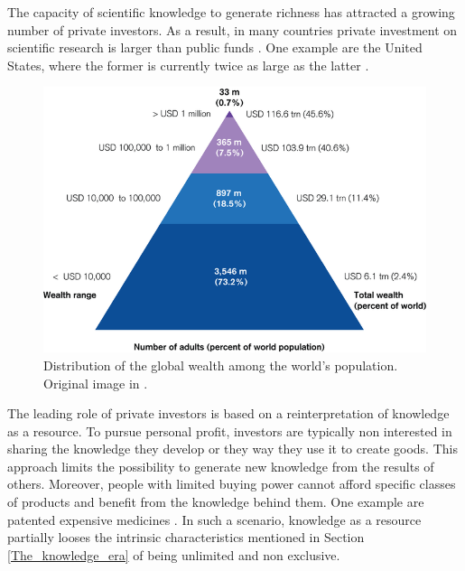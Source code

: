 The capacity of scientific knowledge to generate richness has attracted a growing number of private investors. As a result, in many countries private investment on scientific research is larger than public funds \cite{UNESCO}. One example are the United States, where the former is currently twice as large as the latter \cite{Boroush}. 

\begin{figure}[!t] 
 \begin{center}
 \includegraphics[scale=0.3]{Images/Global_wealth_pyramid.png}
 \caption{Distribution of the global wealth among the world's population. Original image in \cite{Kersley}.}
 \label{Global_wealth_pyramid}
 \end{center}
\end{figure}

The leading role of private investors is based on a reinterpretation of knowledge as a resource. To pursue personal profit, investors are typically non interested in sharing the knowledge they develop or they way they use it to create goods. This approach limits the possibility to generate new knowledge from the results of others. Moreover, people with limited buying power cannot afford specific classes of products and benefit from the knowledge behind them. One example are patented expensive medicines \cite{Heller}. In such a scenario, knowledge as a resource partially looses the intrinsic characteristics mentioned in Section \ref{The_knowledge_era} of being unlimited and non exclusive. 

